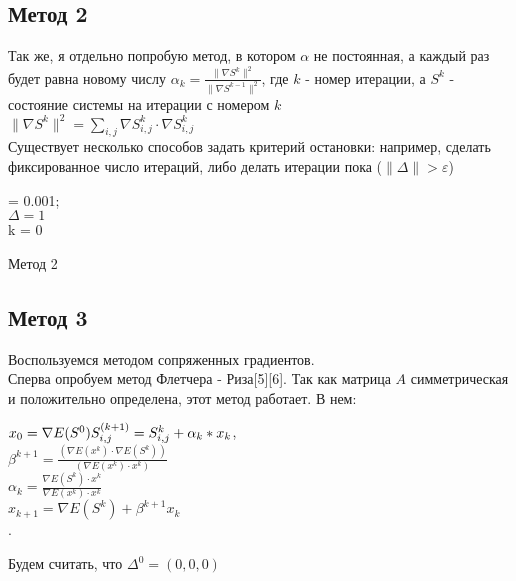 \documentclass[ 12pt,x11names]{article}
\begin{document}
    \subsection{Метод 2}
    Так же, я  отдельно попробую метод, в котором  $\alpha$ не постоянная, а каждый раз будет равна новому числу
     $\alpha_k  = \frac{\| \nabla S^k \|^2}{\| \nabla S^{k-1} \|^2}$, где $k$ - номер итерации, а $S^k$ - состояние системы на итерации с номером $k$\\
     $\| \nabla S^k \|^2  = \displaystyle{\sum_{i, j}}  \nabla S^k_{i,j} \cdot  \nabla S^k_{i,j}$\\
    Существует несколько способов задать критерий остановки: например, сделать фиксированное число итераций, либо делать итерации пока  ($\| \Delta \|> \varepsilon$)\\
    \begin{algorithm}[H]
		\SetAlgoLined
		\alpha = 0.001;\\
		$ \Delta  = 1$\\
		k = 0\\
	\caption{Метод 2}
    \end{algorithm}
    \subsection{Метод 3}
    Воспользуемся методом сопряженных градиентов.\\
    Сперва опробуем метод Флетчера - Риза[5][6].
    Так как матрица $A$ симметрическая и положительно определена, этот метод работает.
    В нем:
    \begin{center}
    $ x_0= \nabla E(S^0)\\
    S^{(k + 1)}_{i, j} = S^{k}_{i, j} + \alpha_k * x_k $,\\
     $\beta ^{k +1} = \frac{ (\nabla E(x^k) \cdot \nabla E(S^k))} { (\nabla E(x^k) \cdot x^k)}$\\
    $\alpha_k =\frac{\nabla E(S^k) \cdot x^k}{\nabla E(x^k) \cdot x^k}$\\
    $x_{k + 1}= \nabla E(S^k) + \beta ^ {k + 1} x_k$\\
   .
    \end{center}
    Будем считать, что $\Delta^0=(0,0,0)$\\
\end{document}
